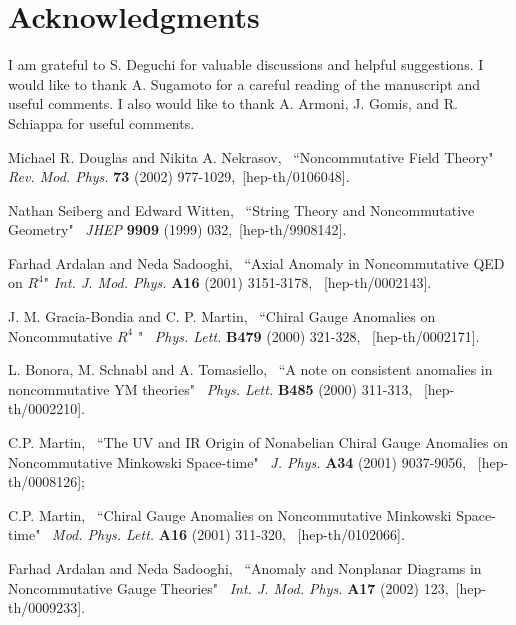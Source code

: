 \documentclass[a4paper,12pt]{article}
\begin{document}





\section*{Acknowledgments}

I am grateful to S. Deguchi for valuable discussions and helpful suggestions. 
I would like to thank A. Sugamoto for a careful reading of the manuscript 
and useful comments. I also would like to thank A. Armoni, J. Gomis, and 
R. Schiappa for useful comments. 

\begin{thebibliography}{References}


Michael R. Douglas and Nikita A. Nekrasov, \, ``Noncommutative Field Theory" 
\, {\it Rev. Mod. Phys.} {\bf 73} (2002) 977-1029, \,[hep-th/0106048]. 

Nathan Seiberg and Edward Witten, \, ``String Theory and Noncommutative 
Geometry" \, {\it JHEP} {\bf 9909} (1999) 032, \,[hep-th/9908142]. 

Farhad Ardalan and Neda Sadooghi, \, ``Axial Anomaly in Noncommutative QED 
on ${R}^4$"  {\it Int. J. Mod. Phys.} {\bf A16} (2001) 3151-3178, \, 
[hep-th/0002143]. 

J. M. Gracia-Bondia and C. P. Martin, \, ``Chiral Gauge Anomalies on 
Noncommutative $R^{4}$ " \, {\it Phys. Lett.} {\bf B479} (2000) 321-328, \,
[hep-th/0002171]. 

L. Bonora, M. Schnabl and A. Tomasiello, \, ``A note on consistent anomalies 
in noncommutative YM theories" \, {\it Phys. Lett.} {\bf B485} (2000) 311-313, 
\, [hep-th/0002210].

C.P. Martin, \, ``The UV and IR Origin of Nonabelian Chiral Gauge Anomalies on 
Noncommutative Minkowski Space-time" \, {\it J. Phys.} {\bf A34} (2001) 
9037-9056,  \, [hep-th/0008126]; 

C.P. Martin, \, ``Chiral Gauge Anomalies on Noncommutative Minkowski 
Space-time" \, {\it Mod. Phys. Lett.} {\bf A16} (2001) 311-320, \, 
[hep-th/0102066]. 

Farhad Ardalan and Neda Sadooghi, \, ``Anomaly and Nonplanar Diagrams in 
Noncommutative Gauge Theories" \, {\it Int. J. Mod. Phys.} {\bf A17} 
(2002) 123, \,[hep-th/0009233]. 



\end{thebibliography}
\end{document}
